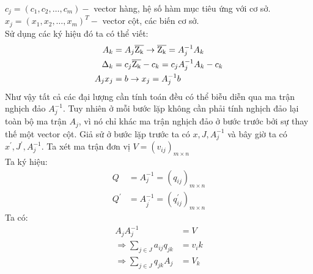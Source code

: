 \documentclass{article}
\begin{document}
\begin{enumerate}
                        $c_j = (c_1,c_2,\ldots,c_m)-$ vector hàng, hệ số hàm mục tiêu ứng với cơ sở. \\
                        $x_j=(x_1,x_2,\ldots,x_m)^T-$ vector cột, các biến cơ sở. \\
                        Sử dụng các ký hiệu đó ta có thể viết: \\
                            \begin{equation} \label{3da}
                                \begin{split}
                                    A_k&=A_j \overline{\rm Z_k} \rightarrow \overline{\rm Z_k}=A_j^{-1}A_k \\
                                    \Delta_k&=c_j\overline{\rm Z_k}-c_k=c_jA_j^{-1}A_k-c_k \\
                                    A_jx_j&=b \rightarrow x_j=A_j^{-1}b
                                \end{split}
                            \end{equation}
                            Như vậy tất cả các đại lượng cần tính toán đều có thể biễu diễn qua ma trận nghịch đảo $A_j^{-1}$. Tuy nhiên ở mỗi bước lặp không cần phải tính nghịch đảo lại toàn bộ ma trận $A_j$, vì nó chỉ khác ma trận nghịch đảo ở bước trước bởi sự thay thế một vector cột. Giả sử ở bước lặp trước ta có $x,J,A_j^{-1}$ và bây giờ ta có $x^{'},J^{'},A_j^{-1}$. Ta xét ma trận đơn vị $V=(v_{ij})_{m \times n}$ \\
                            Ta ký hiệu:
                                \begin{equation}
                                    \begin{split}
                                        Q&=A_j^{-1}=(q_{ij})_{m \times n} \\
                                        Q^{'}&=A_{j^{'}}^{-1}=(q_{ij}^{'})_{m \times n}
                                    \end{split}
                                \end{equation}
                            Ta có:
                                \begin{equation} \label{4}
                                    \begin{split}
                                        A_jA_j^{-1}&=V \\
                                        \Rightarrow \sum_{j \in J}a_{ij}q_{jk}&=v_ik \\
                                        \Rightarrow \sum_{j \in J}q_{jk}A_j&=V_k

\end{split}
\end{equation}
\end{enumerate}
\end{document}
